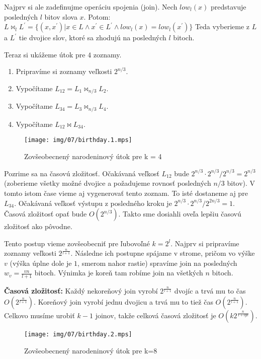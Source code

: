 Najprv si ale zadefinujme operáciu spojenia (join). Nech $low_l(x)$ predstavuje
posledných $l$ bitov slova $x$. Potom:
$L \bowtie_l L^{'} = \{(x, x^{'}) | x \in L \land x^{'} \in L^{'} \land low_{l}(x) = low_l(x^{'})\}$
Teda vyberieme z $L$ a $L^{'}$ tie dvojice slov, ktoré sa zhodujú na posledných
$l$ bitoch.

Teraz si ukážeme útok pre $4$ zoznamy. 
\begin{enumerate}
\item Pripravíme si zoznamy veľkosti $2^{n/3}$.
\item Vypočítame $L_{12} = L_1 \bowtie_{n/3} L_2$.
\item Vypočítame $L_{34} = L_3 \bowtie_{n/3} L_4$.
\item Vypočítame $L_{12} \bowtie L_{34}$.
\end{enumerate}

\begin{figure}
    \centering
    \texttt{[image: img/07/birthday.1.mps]}
    \caption{Zovšeobecnený narodeninový útok pre k = 4}
\end{figure}


Pozrime sa na časovú zložitosť. Očakávaná veľkosť $L_{12}$ bude $2^{n/3} \cdot 2^{n/3} / 2^{n/3} = 2^{n/3}$ (zoberieme všetky možné
dvojice a požadujeme rovnosť posledných $n/3$ bitov). V tomto istom čase vieme aj vygenerovať tento zoznam. To isté
dostaneme aj pre $L_{34}$. Očakávaná veľkosť výstupu z posledného kroku je $2^{n/3} \cdot 2^{n/3} / 2^{2n/3} = 1$.
Časová zložitosť opať bude $O(2^{n/3})$. Takto sme dosiahli oveľa lepšiu časovú zložitosť ako pôvodne.

Tento postup vieme zovšeobecniť pre ľubovoľné $k = 2^l$. 
Najprv si pripravíme zoznamy veľkosti $2^{\frac{n}{l+1}}$. Následne ich postupne spájame v strome, pričom
vo výške $v$ (výška úplne dole je $1$, smerom nahor rastie) spravíme join na posledných $w_v = \frac{vn}{l + 1}$
bitoch. Výnimka je koreň tam robíme join na všetkých $n$ bitoch.

{\bf Časová zložitosť:} Každý nekoreňový join vyrobí $2^{\frac{n}{l+1}}$ dvojíc a trvá mu to čas $O(2^{\frac{n}{l+1}})$.
Koreňový join vyrobí jednu dvojicu a trvá mu to tiež čas $O(2^{\frac{n}{l+1}})$. Celkovo musíme urobiť $k-1$ joinov, takže
celková časová zložitosť je $O(k 2^{\frac{n}{1+lg k}})$.

\begin{figure}
    \centering
    \texttt{[image: img/07/birthday.2.mps]}
    \caption{Zovšeobecnený narodeninový útok pre k=8}
\end{figure}

